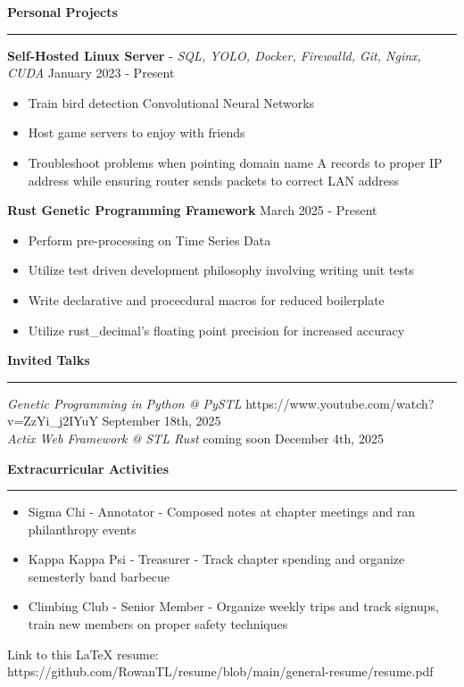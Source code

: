 \documentclass[11pt]{article}
\begin{document}

\vspace{1pt}  %
\textbf{Personal Projects}\par
\vspace{-12pt}
\noindent\rule{\textwidth}{0.4pt}

\textbf{Self-Hosted Linux Server} - \textsl{SQL, YOLO, Docker, Firewalld, Git, Nginx, CUDA} \hfill January 2023 - Present
\begin{itemize}[noitemsep, topsep=0pt, partopsep=0pt, parsep=0pt, itemsep=0pt]
    \small
    \item Train bird detection Convolutional Neural Networks
    \item Host game servers to enjoy with friends
    \item Troubleshoot problems when pointing domain name A records to proper IP address while ensuring router sends packets to correct LAN address
\end{itemize}

\textbf{Rust Genetic Programming Framework} \hfill March 2025 - Present
\begin{itemize}[noitemsep, topsep=0pt, partopsep=0pt, parsep=0pt, itemsep=0pt]
    \small
    \item Perform pre-processing on Time Series Data
    \item Utilize test driven development philosophy involving writing unit tests
    \item Write declarative and procecdural macros for reduced boilerplate
    \item Utilize rust\_decimal's floating point precision for increased accuracy
\end{itemize}

\textbf{Invited Talks}\par
\vspace{-12pt}
\noindent\rule{\textwidth}{0.4pt}

\textsl{Genetic Programming in Python @ PySTL} \tiny{https://www.youtube.com/watch?v=ZzYi\_j2IYuY} \hfill \normalsize{September 18th, 2025}\\
\textsl{Actix Web Framework @ STL Rust} \tiny{coming soon} \hfill \normalsize{December 4th, 2025}

\textbf{Extracurricular Activities}\par
\vspace{-12pt}
\noindent\rule{\textwidth}{0.4pt}

\begin{itemize}[noitemsep, topsep=0pt, partopsep=0pt, parsep=0pt, itemsep=0pt]
    \small
    \item Sigma Chi - Annotator - Composed notes at chapter meetings and ran philanthropy events
    \item Kappa Kappa Psi - Treasurer - Track chapter spending and organize semesterly band barbecue
    \item Climbing Club - Senior Member - Organize weekly trips and track signups, train new members on proper safety techniques
\end{itemize}

\begin{center}
    \tiny{Link to this LaTeX resume: https://github.com/RowanTL/resume/blob/main/general-resume/resume.pdf}
\end{center}
\end{document}
